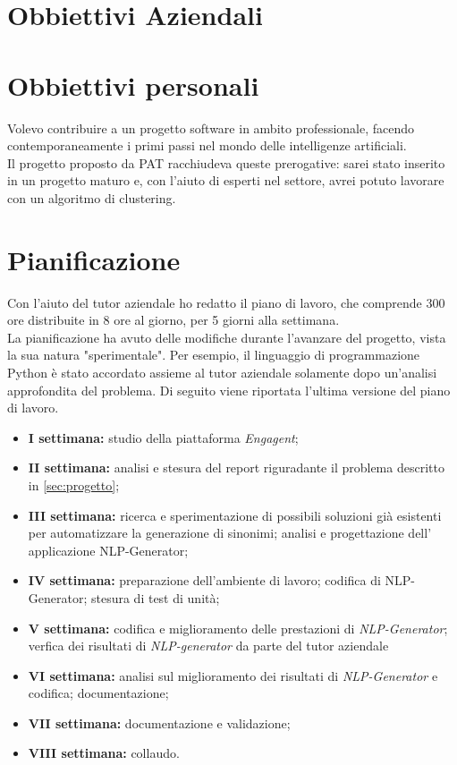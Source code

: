 \section{Obbiettivi Aziendali}


\section{Obbiettivi personali}

Volevo contribuire a un progetto software in ambito professionale, facendo contemporaneamente i primi passi nel mondo delle intelligenze artificiali.\\
Il progetto proposto da PAT racchiudeva queste prerogative: sarei stato inserito in un progetto maturo e, con l'aiuto di esperti nel settore, avrei potuto lavorare con un algoritmo di clustering.   

\section{Pianificazione}
Con l'aiuto del tutor aziendale ho redatto il piano di lavoro, che comprende 300 ore distribuite in 8 ore al giorno, per 5 giorni alla settimana.\\
La pianificazione ha avuto delle modifiche durante l'avanzare del progetto, vista la sua natura "sperimentale". Per esempio, il linguaggio di programmazione Python è stato accordato assieme al tutor aziendale solamente dopo un'analisi approfondita del problema.
Di seguito viene riportata l'ultima versione del piano di lavoro.
\begin{itemize}
    \item \textbf{I settimana:} studio della piattaforma \emph{Engagent};
    \item \textbf{II settimana:} analisi e stesura del report riguradante il problema descritto in \ref{sec:progetto};
    \item \textbf{III settimana:} ricerca e sperimentazione di possibili soluzioni già esistenti per automatizzare la generazione di sinonimi; analisi e progettazione dell' applicazione NLP-Generator;
    \item \textbf{IV settimana:} preparazione dell'ambiente di lavoro; codifica di NLP-Generator; stesura di test di unità;
    \item \textbf{V settimana:} codifica e miglioramento delle prestazioni di \emph{NLP-Generator}; verfica dei risultati di \emph{NLP-generator} da parte del tutor aziendale
    \item \textbf{VI settimana:} analisi sul miglioramento dei risultati di \emph{NLP-Generator} e codifica; documentazione;
    \item \textbf{VII settimana:} documentazione e validazione;
    \item \textbf{VIII settimana:} collaudo.
\end{itemize}

